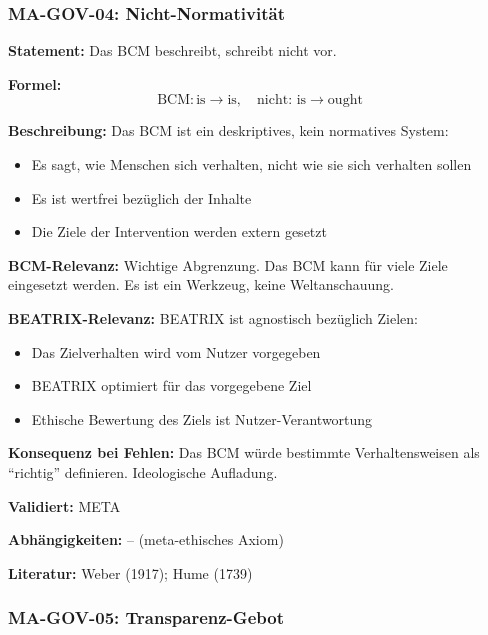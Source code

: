 \subsubsection*{MA-GOV-04: Nicht-Normativität}

\textbf{Statement:} Das BCM beschreibt, schreibt nicht vor.

\textbf{Formel:}
\begin{equation}
\text{BCM}: \text{is} \rightarrow \text{is}, \quad \text{nicht: is} \rightarrow \text{ought}
\end{equation}

\textbf{Beschreibung:}
Das BCM ist ein deskriptives, kein normatives System:
\begin{itemize}
    \item Es sagt, wie Menschen sich verhalten, nicht wie sie sich verhalten sollen
    \item Es ist wertfrei bezüglich der Inhalte
    \item Die Ziele der Intervention werden extern gesetzt
\end{itemize}

\textbf{BCM-Relevanz:}
Wichtige Abgrenzung. Das BCM kann für viele Ziele eingesetzt werden. Es ist ein Werkzeug, keine Weltanschauung.

\textbf{BEATRIX-Relevanz:}
BEATRIX ist agnostisch bezüglich Zielen:
\begin{itemize}
    \item Das Zielverhalten wird vom Nutzer vorgegeben
    \item BEATRIX optimiert für das vorgegebene Ziel
    \item Ethische Bewertung des Ziels ist Nutzer-Verantwortung
\end{itemize}

\textbf{Konsequenz bei Fehlen:}
Das BCM würde bestimmte Verhaltensweisen als ``richtig'' definieren. Ideologische Aufladung.

\textbf{Validiert:} META

\textbf{Abhängigkeiten:} -- (meta-ethisches Axiom)

\textbf{Literatur:} Weber (1917); Hume (1739)


\subsubsection*{MA-GOV-05: Transparenz-Gebot}

